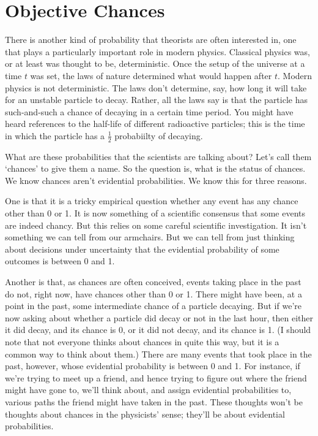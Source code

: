 \section{Objective Chances} 
There is another kind of probability that theorists are often interested in, one that plays a particularly important role in modern physics. Classical physics was, or at least was thought to be, deterministic. Once the setup of the universe at a time $t$ was set, the laws of nature determined what would happen after $t$. Modern physics is not deterministic. The laws don't determine, say, how long it will take for an unstable particle to decay. Rather, all the laws say is that the particle has such-and-such a chance of decaying in a certain time period. You might have heard references to the half-life of different radioactive particles; this is the time in which the particle has a $\frac{1}{2}$ probabiilty of decaying.

What are these probabilities that the scientists are talking about? Let's call them `chances' to give them a name. So the question is, what is the status of chances. We know chances aren't evidential probabilities. We know this for three reasons.

One is that it is a tricky empirical question whether any event has any chance other than 0 or 1. It is now something of a scientific consensus that some events are indeed chancy. But this relies on some careful scientific investigation. It isn't something we can tell from our armchairs. But we can tell from just thinking about decisions under uncertainty that the evidential probability of some outcomes is between 0 and 1.

Another is that, as chances are often conceived, events taking place in the past do not, right now, have chances other than 0 or 1. There might have been, at a point in the past, some intermediate chance of a particle decaying. But if we're now asking about whether a particle did decay or not in the last hour, then either it did decay, and its chance is 0, or it did not decay, and its chance is 1. (I should note that not everyone thinks about chances in quite this way, but it is a common way to think about them.) There are many events that took place in the past, however, whose evidential probability is between 0 and 1. For instance, if we're trying to meet up a friend, and hence trying to figure out where the friend might have gone to, we'll think about, and assign evidential probabilities to, various paths the friend might have taken in the past. These thoughts won't be thoughts about chances in the physicists' sense; they'll be about evidential probabilities.

